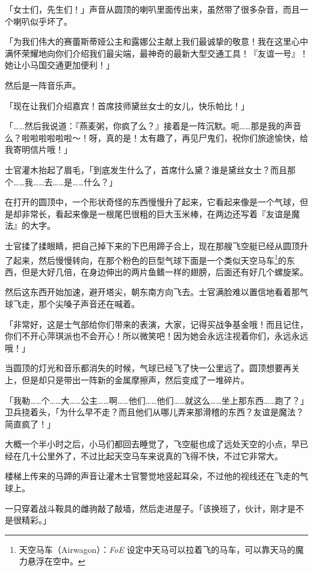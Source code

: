 「女士们，先生们！」声音从圆顶的喇叭里面传出来，虽然带了很多杂音，而且一个喇叭似乎坏了。

「为我们伟大的赛蕾斯蒂娅公主和露娜公主献上我们最诚挚的敬意！我在这里心中满怀荣耀地向你们介绍我们最尖端，最神奇的最新大型交通工具！『友谊一号』！她让小马国交通更加便利！」

然后是一阵音乐声。

「现在让我们介绍嘉宾！首席技师黛丝女士的女儿，快乐帕比！」

「……然后我说道：『燕麦粥，你疯了么？』接着是一阵沉默。呃……那是我的声音么？啦啦啦啦啦啦～！呀，真的是！太有趣了，再见尸鬼们，祝你们旅途愉快，给我寄明信片哦！」

士官灌木抬起了眉毛，「到底发生什么了，首席什么黛？谁是黛丝女士？而且那个……我……去……是……什么？」

在打开的圆顶中，一个形状奇怪的东西慢慢升了起来，它看起来像是一个气球，但是却非常长，看起来像是一根尾巴很粗的巨大玉米棒，在两边还写着『友谊是魔法』的大字。

士官揉了揉眼睛，把自己掉下来的下巴用蹄子合上，现在那艘飞空艇已经从圆顶升了起来，然后慢慢转向，在那个粉色的巨型气球下面是一个类似天空马车\footnote{天空马车（Airwagon）：\emph{FoE} 设定中天马可以拉着飞的马车，可以靠天马的魔力悬浮在空中。}的东西，但是大好几倍，在身边伸出的两片鱼鳍一样的翅膀，后面还有好几个螺旋桨。

然后这东西开始加速，避开塔尖，朝东南方向飞去。士官满脸难以置信地看着那气球飞走，那个尖嗓子声音还在喊着。

「非常好，这是士气部给你们带来的表演，大家，记得买战争基金哦！而且记住，你们不开心萍琪派也不会开心！所以微笑吧！因为她会永远注视着你们，永远永远哦！」

当圆顶的灯光和音乐都消失的时候，气球已经飞了快一公里远了。圆顶想要再关上，但是却只是带出一阵新的金属摩擦声，然后变成了一堆碎片。

「我勒……个……大……公主……啊……他们……他们……就这么……坐上那东西……跑了？」卫兵挠着头，「为什么早不走？而且他们从哪儿弄来那滑稽的东西？友谊是魔法？简直疯了！」


\horizonline

大概一个半小时之后，小马们都回去睡觉了，飞空艇也成了远处天空的小点，早已经在几十公里外了，不过比起天空马车来说真的飞得不快，不过它非常大。

楼梯上传来的马蹄的声音让灌木士官警觉地竖起耳朵，不过他的视线还在飞走的气球上。

一只穿着战斗鞍具的雌驹敲了敲墙，然后走进屋子。「该换班了，伙计，刚才是不是很精彩。」


